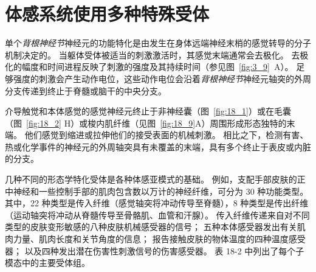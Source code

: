\section{体感系统使用多种特殊受体}

单个\textit{背根神经节}神经元的功能特化是由发生在身体远端神经末梢的感觉转导的分子机制决定的。
当躯体受体被适当的刺激激活时，其感觉末端通常会去极化。
去极化的幅度和时间进程反映了刺激的强度及其持续时间（参见图~\ref{fig:3_9}~A）。 
足够强度的刺激会产生动作电位，这些动作电位会沿着\textit{背根神经节}神经元轴突的外周分支传递到终止于脊髓或脑干的中央分支。


介导触觉和本体感觉的感觉神经元终止于非神经囊（图~\ref{fig:18_1}）或在毛囊（图~\ref{fig:18_2} H）或梭内肌纤维（见图~\ref{fig:18_9}A）周围形成形态独特的末端。
他们感觉到缩进或拉伸他们的接受表面的机械刺激。
相比之下，检测有害、热或化学事件的神经元的外周轴突具有未覆盖的末端，具有多个终止于表皮或内脏的分支。


几种不同的形态学特化受体是各种体感亚模式的基础。
例如，支配手部皮肤的正中神经和一些控制手部的肌肉包含数以万计的神经纤维，可分为 30 种功能类型。
其中，22 种类型是传入纤维（感觉轴突将冲动传导至脊髓），8 种类型是传出纤维（运动轴突将冲动从脊髓传导至骨骼肌、血管和汗腺）。
传入纤维传递来自对不同类型的皮肤变形敏感的八种皮肤机械感受器的信号；
五种本体感受器发出有关肌肉力量、肌肉长度和关节角度的信息；
报告接触皮肤的物体温度的四种温度感受器；
以及四种发出潜在伤害性刺激信号的伤害感受器。
表 18-2 中列出了每个子模态中的主要受体组。


